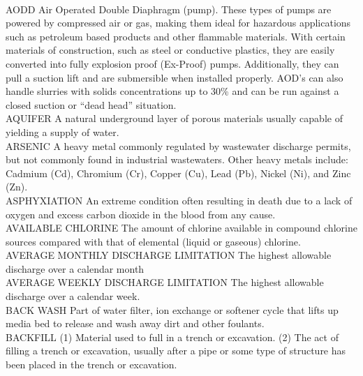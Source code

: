 \vspace{0.3cm}\\
AODD
Air Operated Double Diaphragm (pump). These types of pumps are powered by compressed air or gas, making them ideal for hazardous applications such as petroleum based products and other flammable materials. With certain materials of construction, such as steel or conductive plastics, they are easily converted into fully explosion proof (Ex-Proof) pumps. Additionally, they can pull a suction lift and are submersible when installed properly. AOD’s can also handle slurries with solids concentrations up to 30\% and can be run against a closed suction or “dead head” situation.
\vspace{0.3cm}\\
AQUIFER
A natural underground layer of porous materials usually capable of yielding a supply of water.
\vspace{0.3cm}\\
ARSENIC
A heavy metal commonly regulated by wastewater discharge permits, but not commonly found in industrial wastewaters. Other heavy metals include: Cadmium (Cd), Chromium (Cr), Copper (Cu), Lead (Pb), Nickel (Ni), and Zinc (Zn).
\vspace{0.3cm}\\
ASPHYXIATION
An extreme condition often resulting in death due to a lack of oxygen and excess carbon dioxide in the blood from any cause. 
\vspace{0.3cm}\\
AVAILABLE CHLORINE
The amount of chlorine available in compound chlorine sources compared with that of elemental (liquid or gaseous) chlorine.
\vspace{0.3cm}\\
AVERAGE MONTHLY DISCHARGE LIMITATION
The highest allowable discharge over a calendar month 
\vspace{0.3cm}\\
AVERAGE WEEKLY DISCHARGE LIMITATION
The highest allowable discharge over a calendar week. 
\vspace{0.3cm}\\
BACK WASH
Part of water filter, ion exchange or softener cycle that lifts up media bed to release and wash away dirt and other foulants.
\vspace{0.3cm}\\
BACKFILL
(1) Material used to full in a trench or excavation. (2) The act of filling a trench or excavation, usually after a pipe or some type of structure has been placed in the trench or excavation. 
\vspace{0.3cm}\\
